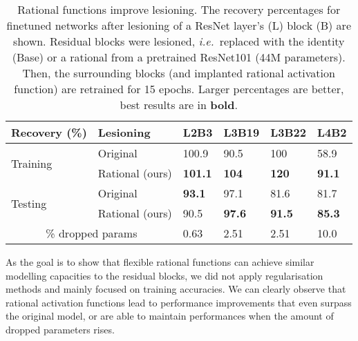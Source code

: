 \documentclass[accepted]{article}
\theoremstyle{plain}
\theoremstyle{definition}
\theoremstyle{remark}
\newcommand{\ie}{\emph{i.e.}~}
\begin{document}
\begin{table}[H]
\vspace{-0.33cm}
\caption{Rational functions improve lesioning. The recovery percentages for finetuned networks after lesioning \citep{VeitWB16} of a ResNet layer's (L) block (B) are shown. Residual blocks were lesioned, \ie replaced with the identity (Base) or a rational from a pretrained ResNet101 (44M parameters). Then, the surrounding blocks (and implanted rational activation function) are retrained for 15 epochs. Larger percentages are better, best results are in \textbf{bold}.}
\label{tab:surgery_comp}
\vskip 0.15in
\centering
\setlength{}
\begin{tabular}{@{}llllll@{}}
\toprule
Recovery (\%)                  & Lesioning      & L2B3           & L3B19         & L3B22         & L4B2         \\  \toprule
\multirow{2}{*}{Training} & Original \citep{VeitWB16} & 100.9           & 90.5           & 100          & 58.9          \\ & Rational (ours)    & \textbf{101.1 } & \textbf{104} & \textbf{120} & \textbf{91.1} \\ \midrule
\multirow{2}{*}{Testing}  & Original \citep{VeitWB16} & \textbf{93.1}   & 97.1           & 81.6           & 81.7          \\ & Rational (ours)      & 90.5            & \textbf{97.6}  & \textbf{91.5}  & \textbf{85.3} \\ \midrule
\multicolumn{2}{c}{\% dropped params}               & 0.63            & 2.51           & 2.51           & 10.0          \\ 
\bottomrule
\end{tabular}
\end{table}

As the goal is to show that flexible rational functions can achieve similar modelling capacities to the residual blocks, we did not apply regularisation methods and mainly focused on training accuracies. We can clearly observe that rational activation functions lead to performance improvements that even surpass the original model, or are able to maintain performances when the amount of dropped parameters rises.
\end{document}

